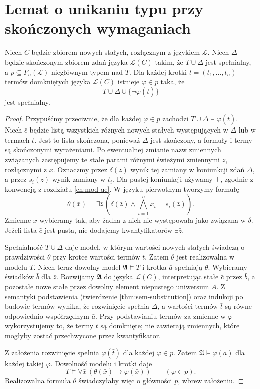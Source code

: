\section{Lemat o unikaniu typu przy skończonych wymaganiach}
\begin{lemat}
\label{lem:mod-ott-avoidance}
Niech $C$ będzie zbiorem nowych stałych,
rozłącznym z językiem $\mathcal L$.
Niech $\Delta$ będzie skończonym zbiorem zdań
języka $\mathcal L(C)$ takim, że $T\cup\Delta$
jest spełnialny, a $p\subseteq F_n(\mathcal L)$
niegłównym typem nad $T$. Dla każdej krotki
$\bar t=(t_1,\ldots,t_n)$ termów domkniętych
języka $\mathcal L(C)$ istnieje $\varphi\in p$
taka, że
\[
T\cup\Delta\cup\{\neg\varphi(\bar t)\}
\]
jest spełnialny.
\end{lemat}
\begin{proof}
Przypuśćmy przeciwnie, że dla każdej $\varphi\in p$
zachodzi $T\cup\Delta\models\varphi(\bar t)$.
Niech $\bar c$ będzie listą wszystkich różnych nowych
stałych występujących w $\Delta$ lub w termach $\bar t$.
Jest to lista skończona, ponieważ $\Delta$ jest
skończony, a formuły i termy są skończonymi wyrażeniami.
Po ewentualnej zmianie nazw zmiennych związanych
zastępujemy te stałe parami różnymi świeżymi
zmiennymi $\bar z$, rozłącznymi z $\bar x$.
Oznaczmy przez $\delta(\bar z)$ wynik tej zamiany
w koniunkcji zdań $\Delta$, a przez
$s_i(\bar z)$ wynik zamiany w $t_i$.
Dla pustej koniunkcji używamy $\top$,
zgodnie z konwencją z rozdziału \ref{ch:mod-qe}.
W języku pierwotnym tworzymy formułę
\[
\theta(\bar x)=
\exists\bar z\,\left(
\delta(\bar z)\land\bigwedge_{i=1}^{n} x_i=s_i(\bar z)
\right).
\]
Zmienne $\bar x$ wybieramy tak, aby żadna z nich
nie występowała jako związana w $\delta$.
Jeżeli lista $\bar c$ jest pusta, nie dodajemy
kwantyfikatorów $\exists\bar z$.

Spełnialność $T\cup\Delta$ daje model, w którym
wartości nowych stałych świadczą o prawdziwości
$\theta$ przy krotce wartości termów $\bar t$.
Zatem $\theta$ jest realizowalna w modelu $T$.
Niech teraz dowolny model $\mathfrak A\models T$
i krotka $\bar a$ spełniają $\theta$.
Wybieramy świadków $\bar b$ dla $\bar z$.
Rozwijamy $\mathfrak A$ do języka $\mathcal L(C)$,
interpretując stałe $\bar c$ przez $\bar b$,
a pozostałe nowe stałe przez dowolny element
niepustego uniwersum $A$. Z semantyki podstawienia
(twierdzenie \ref{thm:sem-substitution}) oraz
indukcji po budowie termów wynika, że rozwinięcie
spełnia $\Delta$, a wartości termów $\bar t$
są równe odpowiednio współrzędnym $\bar a$.
Przy podstawianiu termów za zmienne w $\varphi$
wykorzystujemy to, że termy $\bar t$ są domknięte;
nie zawierają zmiennych, które mogłyby zostać
przechwycone przez kwantyfikator.

Z założenia rozwinięcie spełnia $\varphi(\bar t)$
dla każdej $\varphi\in p$. Zatem
$\mathfrak A\models\varphi(\bar a)$ dla każdej
takiej $\varphi$. Dowolność modelu i krotki daje
\[
T\models\forall\bar x\,(\theta(\bar x)\to\varphi(\bar x))
\qquad(\varphi\in p).
\]
Realizowalna formuła $\theta$ świadczyłaby więc
o główności $p$, wbrew założeniu.
\end{proof}

